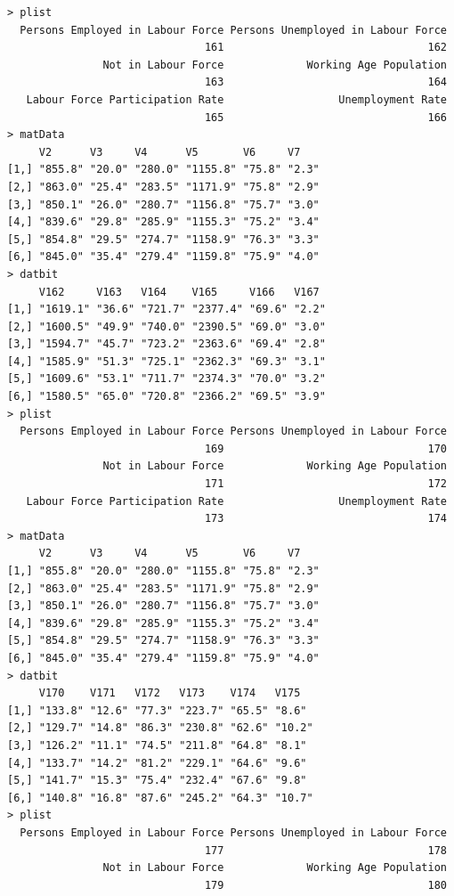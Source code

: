 \documentclass[a4paper]{article}
\begin{document}
\begin{verbatim}
> plist 
  Persons Employed in Labour Force Persons Unemployed in Labour Force 
                               161                                162 
               Not in Labour Force             Working Age Population 
                               163                                164 
   Labour Force Participation Rate                  Unemployment Rate 
                               165                                166 
> matData 
     V2      V3     V4      V5       V6     V7   
[1,] "855.8" "20.0" "280.0" "1155.8" "75.8" "2.3"
[2,] "863.0" "25.4" "283.5" "1171.9" "75.8" "2.9"
[3,] "850.1" "26.0" "280.7" "1156.8" "75.7" "3.0"
[4,] "839.6" "29.8" "285.9" "1155.3" "75.2" "3.4"
[5,] "854.8" "29.5" "274.7" "1158.9" "76.3" "3.3"
[6,] "845.0" "35.4" "279.4" "1159.8" "75.9" "4.0"
> datbit 
     V162     V163   V164    V165     V166   V167 
[1,] "1619.1" "36.6" "721.7" "2377.4" "69.6" "2.2"
[2,] "1600.5" "49.9" "740.0" "2390.5" "69.0" "3.0"
[3,] "1594.7" "45.7" "723.2" "2363.6" "69.4" "2.8"
[4,] "1585.9" "51.3" "725.1" "2362.3" "69.3" "3.1"
[5,] "1609.6" "53.1" "711.7" "2374.3" "70.0" "3.2"
[6,] "1580.5" "65.0" "720.8" "2366.2" "69.5" "3.9"
> plist 
  Persons Employed in Labour Force Persons Unemployed in Labour Force 
                               169                                170 
               Not in Labour Force             Working Age Population 
                               171                                172 
   Labour Force Participation Rate                  Unemployment Rate 
                               173                                174 
> matData 
     V2      V3     V4      V5       V6     V7   
[1,] "855.8" "20.0" "280.0" "1155.8" "75.8" "2.3"
[2,] "863.0" "25.4" "283.5" "1171.9" "75.8" "2.9"
[3,] "850.1" "26.0" "280.7" "1156.8" "75.7" "3.0"
[4,] "839.6" "29.8" "285.9" "1155.3" "75.2" "3.4"
[5,] "854.8" "29.5" "274.7" "1158.9" "76.3" "3.3"
[6,] "845.0" "35.4" "279.4" "1159.8" "75.9" "4.0"
> datbit 
     V170    V171   V172   V173    V174   V175  
[1,] "133.8" "12.6" "77.3" "223.7" "65.5" "8.6" 
[2,] "129.7" "14.8" "86.3" "230.8" "62.6" "10.2"
[3,] "126.2" "11.1" "74.5" "211.8" "64.8" "8.1" 
[4,] "133.7" "14.2" "81.2" "229.1" "64.6" "9.6" 
[5,] "141.7" "15.3" "75.4" "232.4" "67.6" "9.8" 
[6,] "140.8" "16.8" "87.6" "245.2" "64.3" "10.7"
> plist 
  Persons Employed in Labour Force Persons Unemployed in Labour Force 
                               177                                178 
               Not in Labour Force             Working Age Population 
                               179                                180 

\end{verbatim}
\end{document}
